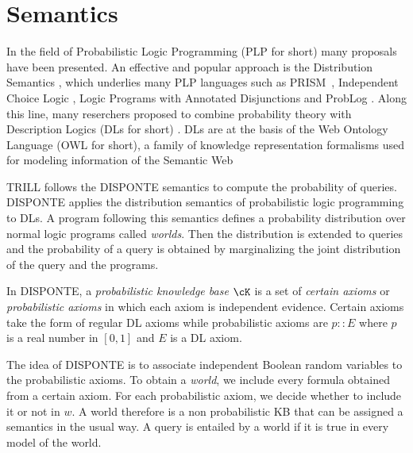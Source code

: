 \section{Semantics}
\label{semantics}

In the field of Probabilistic Logic Programming (PLP for short) many proposals have been presented. 
An effective and popular approach is the Distribution Semantics \cite{DBLP:conf/iclp/Sato95}, which underlies many PLP languages such as
 PRISM~\cite{DBLP:conf/iclp/Sato95,DBLP:journals/jair/SatoK01},
 Independent Choice Logic  \cite{Poo97-ArtInt-IJ}, Logic Programs with Annotated Disjunctions \cite{VenVer04-ICLP04-IC} and ProbLog \cite{DBLP:conf/ijcai/RaedtKT07}.
 Along this line, many reserchers proposed to combine probability theory with Description Logics (DLs for short) \cite{DBLP:journals/ws/LukasiewiczS08,DBLP:conf/rweb/Straccia08}.
DLs are at the basis of the Web Ontology Language (OWL for short), a family of knowledge representation formalisms used for modeling information
 of the Semantic Web

TRILL follows the DISPONTE \cite{RigBelLamZese12-URSW12} semantics to compute the probability of queries.
DISPONTE applies the distribution semantics \cite{DBLP:conf/iclp/Sato95} of probabilistic logic programming to DLs. 
A program following this semantics defines a probability distribution over normal logic programs
called \emph{worlds}. Then the distribution is extended to queries and the probability of a query is obtained by marginalizing the joint distribution of the query and the programs.

In DISPONTE, a \emph{probabilistic knowledge base} $\cK$ is a set of \emph{certain axioms} or \emph{probabilistic axioms} in which each axiom is independent evidence.
Certain axioms take the form of regular DL axioms while probabilistic axioms are
$p::E$
where $p$ is a real number in $[0,1]$ and $E$ is a DL axiom. 

The idea of DISPONTE is to associate independent Boolean random variables to the probabilistic axioms. 
To obtain a \emph{world}, we include every formula obtained from a certain axiom. 
For each probabilistic axiom, we decide whether to include it or not in $w$.
A world therefore is a non probabilistic KB that can be assigned a semantics in the usual way.
A query is entailed by a world if it is true in every  model of the world.


